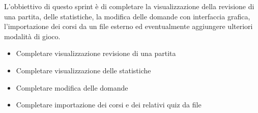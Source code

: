 L'obbiettivo di questo sprint è di completare la visualizzazione della revisione di una partita, delle statistiche, la modifica delle domande con interfaccia grafica, l'importazione dei corsi da un file esterno ed eventualmente aggiungere ulteriori modalità di gioco.
\begin{itemize}
    \item Completare visualizzazione revisione di una partita
    \item Completare visualizzazione delle statistiche
    \item Completare modifica delle domande
    \item Completare importazione dei corsi e dei relativi quiz da file
\end{itemize} 
